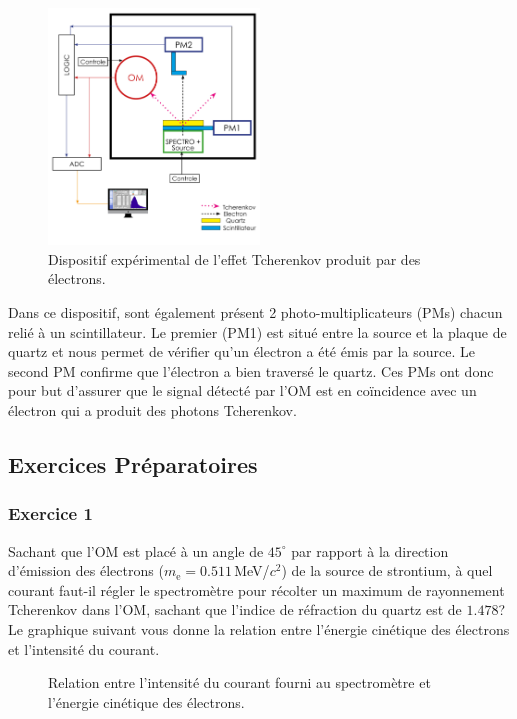 \begin{figure}[!h]
    \centering
    \includegraphics[width=0.5\textwidth]{figures/Dispositif_1.png}
    \caption{Dispositif expérimental de l'effet Tcherenkov produit par des électrons.}
    \label{fig:dispo1} 
\end{figure}

Dans ce dispositif, sont également présent 2 photo-multiplicateurs (PMs) chacun relié à un scintillateur. Le premier (PM1) est situé entre la source et la plaque de quartz et nous permet de vérifier qu'un électron a été émis par la source. Le second PM confirme que l'électron a bien traversé le quartz. Ces PMs ont donc pour but d'assurer que le signal détecté par l'OM est en coïncidence avec un électron qui a produit des photons Tcherenkov.


\subsection{Exercices Préparatoires}

\subsubsection{Exercice 1}
Sachant que l'OM est placé à un angle de $45^\circ$ par rapport à la direction d'émission des électrons ($m_\mathrm{e} = 0.511$\,MeV/$c^2$) de la source de strontium, à quel courant faut-il régler le spectromètre pour récolter un maximum de rayonnement Tcherenkov dans l'OM, sachant que l'indice de réfraction du quartz est de $1.478$?\\

Le graphique suivant vous donne la relation entre l'énergie cinétique des électrons et l'intensité du courant.

\begin{figure}[!h]
    \caption{\label{fig:spectro} Relation entre l'intensité du courant fourni au spectromètre et l'énergie cinétique des électrons.}
\end{figure}

